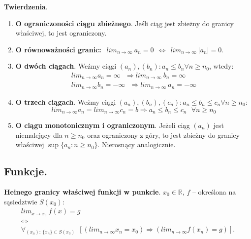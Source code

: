 \documentclass[main.tex]{subfiles}
\begin{document}
    \begin{theorem}
        \textbf{Twierdzenia}.
        \begin{enumerate}
            \item \textbf{O ograniczoności ciągu zbieżnego}. Jeśli ciąg jest zbieżny do granicy właściwej, to jest ograniczony.

            \item \textbf{O równoważności granic:}
            $~~ lim_{n \rightarrow \infty} ~ a_n = 0 ~~ \Leftrightarrow ~~ lim_{n \rightarrow \infty} ~ |a_n| = 0.$

            \item \textbf{O dwóch ciągach}. Weźmy ciągi $(a_n), (b_n): a_n \leq b_n \forall n \geq n_0$, wtedy:
            \begin{gather*}
                lim_{n \rightarrow \infty} a_n = \infty ~~~ \Rightarrow lim_{n \rightarrow \infty} ~ b_n = \infty\\
                lim_{n \rightarrow \infty} b_n = -\infty ~~~ \Rightarrow lim_{n \rightarrow \infty} ~ a_n = -\infty
            \end{gather*}

            \item \textbf{O trzech ciągach}. Weźmy ciągi $(a_n), (b_n), (c_n): a_n \leq b_n \leq c_n \forall n \geq n_0$:
            \[lim_{n  \rightarrow \infty} a_n = lim_{n \rightarrow \infty} c_n = b \Rightarrow a_n \leq b_n \leq c_n ~~~ \forall n \geq n_0\]

            \item \textbf{O ciągu monotonicznym i ograniczonym}. Jeżeli ciąg $(a_n)$ jest niemalejący dla $n \geq n_0$ oraz
            ograniczony z góry, to jest zbieżny do granicy właściwej $\sup\{a_n : n \geq n_0\}$. Nierosnący analogicznie.
        \end{enumerate}
    \end{theorem}

    \subsection{Funkcje.}

    \begin{definition}
        \textbf{Heinego granicy właściwej funkcji w punkcie}. $x_0 \in \mathbb{R}$, $f$ -- określona na sąsiedztwie
        $S(x_0)$:
        \begin{gather*}
            lim_{x \rightarrow x_0} ~ f(x) = g\\
            \Leftrightarrow\\
            \forall_{(x_n): ~ \{x_n\} \subset S(x_0)} ~~ [(lim_{n \rightarrow \infty} x_n = x_0) \Rightarrow (lim_{n \rightarrow \infty} f(x_n) = g)].
        \end{gather*}
    \end{definition}
\end{document}
